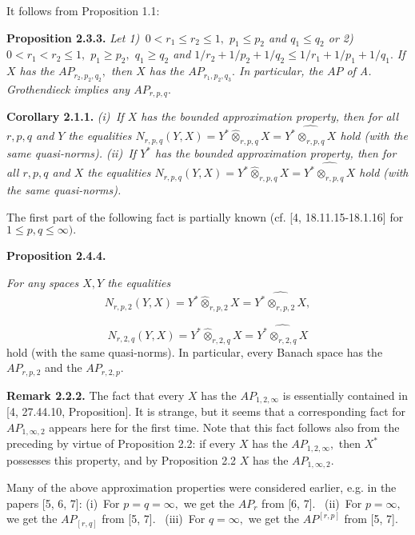 It follows from Proposition 1.1:
\smallskip

\textbf{Proposition 2.3.3.} {\it
Let
1)\,
$0<r_1\leqslant r_2\leqslant1,$ $p_1\leqslant p_2$ and $q_1\leqslant q_2$
or
2)\,
 $0<r_1< r_2\leqslant1,$ $p_1\geqslant p_2,$ $q_1\geqslant q_2$ and
 $1/r_2+1/p_2+1/q_2\leqslant 1/r_1+1/p_1+1/q_1.$
If
$X$ has the $AP_{r_2,p_2,q_2},$ then $X$ has the $AP_{r_1,p_2,q_3}.$
In particular, the $AP$ of A. Grothendieck implies any $AP_{r,p,q}.$
}
\smallskip

\textbf{Corollary 2.1.1.}    {\it
(i)\,
If $X$ has the bounded approximation property, then for all $r,p,q$ and $Y$
the equalities
$N_{r,p,q}(Y,X)= Y^*\widehat\otimes_{r,p,q} X = \widehat{Y^*\otimes_{r,p,q} X}$
hold (with the same quasi-norms).
  (ii)\,
If $Y^*$ has the bounded approximation property, then for all $r,p,q$ and $X$
the equalities
$N_{r,p,q}(Y,X)= Y^*\widehat\otimes_{r,p,q} X = \widehat{Y^*\otimes_{r,p,q} X}$
hold (with the same quasi-norms).
}
                        \smallskip


The first part of the following fact is partially known
(cf. [4, 18.11.15-18.1.16] for $1\leqslant p,q\leqslant\infty).$
\smallskip

 \textbf{Proposition 2.4.4.} {\it
 For any  spaces $X,Y$ the equalities
 $$
    N_{r,p,2}(Y,X)= Y^*\widehat\otimes_{r,p,2} X = \widehat{Y^*\otimes_{r,p,2} X}, $$

$$    N_{r,2,q}(Y,X)= Y^*\widehat\otimes_{r,2,q} X = \widehat{Y^*\otimes_{r,2,q} X}
 $$
 hold (with the same quasi-norms).
 In particular, every Banach space has the $AP_{r,p,2}$ and the $AP_{r,2,p}.$
 }
  \smallskip

\textbf{Remark 2.2.2.}
The fact that every $X$ has the $AP_{1,2,\infty}$ is essentially contained in
[4, 27.44.10, Proposition]. It is strange, but it seems that
a corresponding fact for $AP_{1,\infty,2}$ appears here for the first time.
Note that this fact follows also from the preceding by virtue of Proposition 2.2:
if every $X$ has the $AP_{1,2,\infty},$ then $X^*$ possesses this property,
and by Proposition 2.2 $X$ has the $AP_{1,\infty,2}.$

  \smallskip

Many of the above approximation properties were consider\-ed earlier, e.g. in the
papers [5, 6, 7]:
(i)\,
For $p=q=\infty,$ we get the $AP_r$ from [6, 7].  \,
(ii)\,
For $p=\infty,$ we get the $AP_{[r,q]}$ from [5, 7].   \,
(iii)\,
For $q=\infty,$ we get the $AP^{[r,p]}$ from [5, 7].

\smallskip

